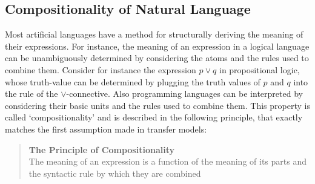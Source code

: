 \documentclass{report}
\theoremstyle{definition}
\theoremstyle{plain}
\begin{document}
\subsection{Compositionality of Natural Language}

Most artificial languages have a method for structurally deriving the meaning of their expressions. For instance, the meaning of an expression in a logical language can be unambiguously determined by considering the atoms and the rules used to combine them. Consider for instance the expression $p\lor q$ in propositional logic, whose truth-value can be determined by plugging the truth values of $p$ and $q$ into the rule of the $\lor$-connective. Also programming languages can be interpreted by considering their basic units and the rules used to combine them. This property is called `compositionality' and is described in the following principle, that exactly matches the first assumption made in transfer models:

\begin{quote}
\textbf{The Principle of Compositionality}\\
The meaning of an expression is a function of the meaning of its parts and the syntactic rule by which they are combined \citep{partee1984compositionality}
\end{quote}
\end{document}
